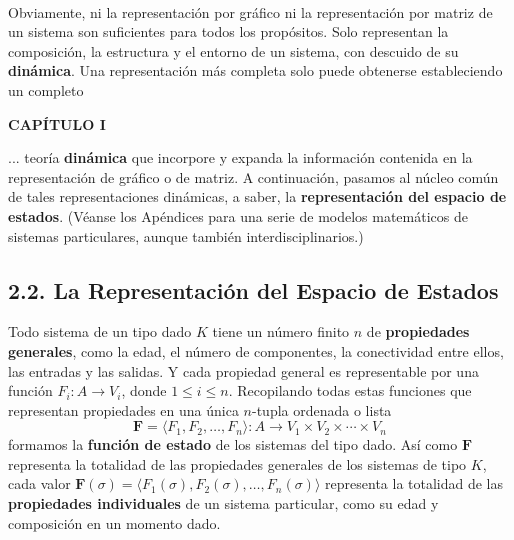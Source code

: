 {\\

Obviamente, ni la representación por gráfico ni la representación por matriz de un sistema son suficientes para todos los propósitos. Solo representan la composición, la estructura y el entorno de un sistema, con descuido de su \textbf{dinámica}. Una representación más completa solo puede obtenerse estableciendo un completo
}

\newpage
\fancyhf{}
\fancyhead[l]{\thepage}
\begin{center}
{\fontsize{16}{18}\selectfont \textbf{CAPÍTULO I}}
\end{center}
\vspace{0.5cm}

{\fontsize{13}{15}\selectfont
... teoría \textbf{dinámica} que incorpore y expanda la información contenida en la representación de gráfico o de matriz. A continuación, pasamos al núcleo común de tales representaciones dinámicas, a saber, la \textbf{representación del espacio de estados}. (Véanse los Apéndices para una serie de modelos matemáticos de sistemas particulares, aunque también interdisciplinarios.)

\subsection*{2.2. La Representación del Espacio de Estados}
Todo sistema de un tipo dado $K$ tiene un número finito $n$ de \textbf{propiedades generales}, como la edad, el número de componentes, la conectividad entre ellos, las entradas y las salidas. Y cada propiedad general es representable por una función $F_i: A \rightarrow V_i$, donde $1 \le i \le n$. Recopilando todas estas funciones que representan propiedades en una única $n$-tupla ordenada o lista
$$ \mathbf{F} = \langle F_1, F_2, \ldots, F_n \rangle : A \longrightarrow V_1 \times V_2 \times \cdots \times V_n $$
formamos la \textbf{función de estado} de los sistemas del tipo dado. Así como $\mathbf{F}$ representa la totalidad de las propiedades generales de los sistemas de tipo $K$, cada valor $\mathbf{F}(\sigma) = \langle F_1(\sigma), F_2(\sigma), \ldots, F_n(\sigma) \rangle$ representa la totalidad de las \textbf{propiedades individuales} de un sistema particular, como su edad y composición en un momento dado.

}
